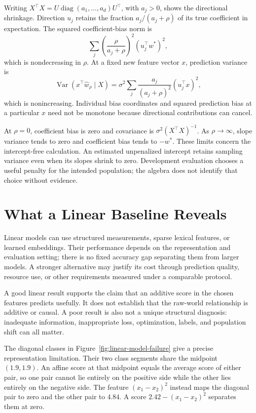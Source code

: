 Writing $X^\top X=U\operatorname{diag}(a_1,\ldots,a_d)U^\top$, with $a_j>0$, shows the directional shrinkage. Direction $u_j$ retains the fraction $a_j/(a_j+\rho)$ of its true coefficient in expectation. The squared coefficient-bias norm is
\[
\sum_j\left(\frac{\rho}{a_j+\rho}\right)^2(u_j^\top w^*)^2,
\]
which is nondecreasing in $\rho$. At a fixed new feature vector $x$, prediction variance is
\[
\operatorname{Var}(x^\top\hat w_\rho\mid X)
=\sigma^2\sum_j\frac{a_j}{(a_j+\rho)^2}(u_j^\top x)^2,
\]
which is nonincreasing. Individual bias coordinates and squared prediction bias at a particular $x$ need not be monotone because directional contributions can cancel.

At $\rho=0$, coefficient bias is zero and covariance is $\sigma^2(X^\top X)^{-1}$. As $\rho\to\infty$, slope variance tends to zero and coefficient bias tends to $-w^*$. These limits concern the intercept-free calculation. An estimated unpenalized intercept retains sampling variance even when its slopes shrink to zero. Development evaluation chooses a useful penalty for the intended population; the algebra does not identify that choice without evidence.

\section{What a Linear Baseline Reveals}

Linear models can use structured measurements, sparse lexical features, or learned embeddings. Their performance depends on the representation and evaluation setting; there is no fixed accuracy gap separating them from larger models. A stronger alternative may justify its cost through prediction quality, resource use, or other requirements measured under a comparable protocol.

A good linear result supports the claim that an additive score in the chosen features predicts usefully. It does not establish that the raw-world relationship is additive or causal. A poor result is also not a unique structural diagnosis: inadequate information, inappropriate loss, optimization, labels, and population shift can all matter.

The diagonal classes in Figure~\ref{fig:linear-model-failure} give a precise representation limitation. Their two class segments share the midpoint $(1.9,1.9)$. An affine score at that midpoint equals the average score of either pair, so one pair cannot lie entirely on the positive side while the other lies entirely on the negative side. The feature $(x_1-x_2)^2$ instead maps the diagonal pair to zero and the other pair to $4.84$. A score $2.42-(x_1-x_2)^2$ separates them at zero.

